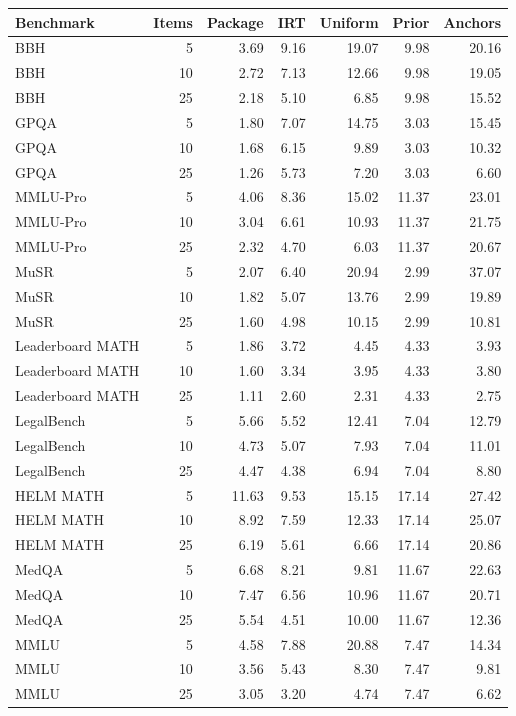 \begin{tabular}{lrrrrrr}
\toprule
Benchmark & Items & Package & IRT & Uniform & Prior & Anchors\\
\midrule
BBH & 5 & 3.69 & 9.16 & 19.07 & 9.98 & 20.16 \\
BBH & 10 & 2.72 & 7.13 & 12.66 & 9.98 & 19.05 \\
BBH & 25 & 2.18 & 5.10 & 6.85 & 9.98 & 15.52 \\
GPQA & 5 & 1.80 & 7.07 & 14.75 & 3.03 & 15.45 \\
GPQA & 10 & 1.68 & 6.15 & 9.89 & 3.03 & 10.32 \\
GPQA & 25 & 1.26 & 5.73 & 7.20 & 3.03 & 6.60 \\
MMLU-Pro & 5 & 4.06 & 8.36 & 15.02 & 11.37 & 23.01 \\
MMLU-Pro & 10 & 3.04 & 6.61 & 10.93 & 11.37 & 21.75 \\
MMLU-Pro & 25 & 2.32 & 4.70 & 6.03 & 11.37 & 20.67 \\
MuSR & 5 & 2.07 & 6.40 & 20.94 & 2.99 & 37.07 \\
MuSR & 10 & 1.82 & 5.07 & 13.76 & 2.99 & 19.89 \\
MuSR & 25 & 1.60 & 4.98 & 10.15 & 2.99 & 10.81 \\
Leaderboard MATH & 5 & 1.86 & 3.72 & 4.45 & 4.33 & 3.93 \\
Leaderboard MATH & 10 & 1.60 & 3.34 & 3.95 & 4.33 & 3.80 \\
Leaderboard MATH & 25 & 1.11 & 2.60 & 2.31 & 4.33 & 2.75 \\
LegalBench & 5 & 5.66 & 5.52 & 12.41 & 7.04 & 12.79 \\
LegalBench & 10 & 4.73 & 5.07 & 7.93 & 7.04 & 11.01 \\
LegalBench & 25 & 4.47 & 4.38 & 6.94 & 7.04 & 8.80 \\
HELM MATH & 5 & 11.63 & 9.53 & 15.15 & 17.14 & 27.42 \\
HELM MATH & 10 & 8.92 & 7.59 & 12.33 & 17.14 & 25.07 \\
HELM MATH & 25 & 6.19 & 5.61 & 6.66 & 17.14 & 20.86 \\
MedQA & 5 & 6.68 & 8.21 & 9.81 & 11.67 & 22.63 \\
MedQA & 10 & 7.47 & 6.56 & 10.96 & 11.67 & 20.71 \\
MedQA & 25 & 5.54 & 4.51 & 10.00 & 11.67 & 12.36 \\
MMLU & 5 & 4.58 & 7.88 & 20.88 & 7.47 & 14.34 \\
MMLU & 10 & 3.56 & 5.43 & 8.30 & 7.47 & 9.81 \\
MMLU & 25 & 3.05 & 3.20 & 4.74 & 7.47 & 6.62 \\
\bottomrule
\end{tabular}
